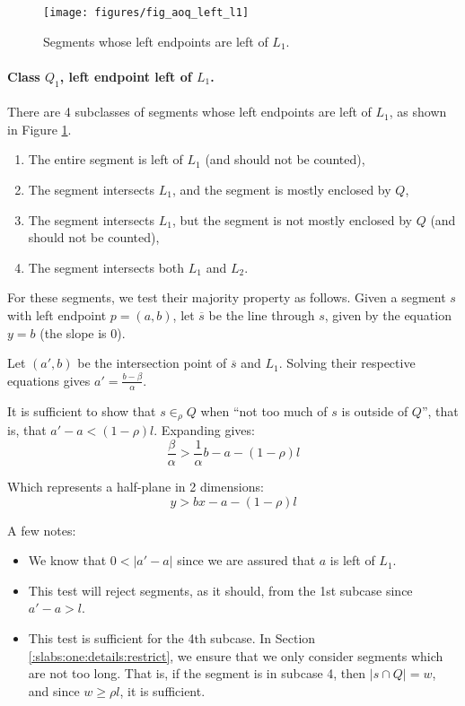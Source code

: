 \begin{figure}[t]
\begin{center}
  \texttt{[image: figures/fig\_aoq\_left\_l1]}
  \caption{Segments whose left endpoints are left of $L_1$.}
  \label{fig:slabs:one:aoq_left_l1}
\end{center}
\end{figure}

\paragraph{Class $Q_1$, left endpoint left of $L_1$.} There are 4 subclasses of segments whose left endpoints are left of $L_1$, as shown in Figure \ref{fig:slabs:one:aoq_left_l1}.

\begin{enumerate}
 \item The entire segment is left of $L_1$ (and should not be counted),

 \item The segment intersects $L_1$, and the segment is mostly enclosed by $Q$,

 \item The segment intersects $L_1$, but the segment is not mostly enclosed by $Q$ (and should not be counted),

 \item The segment intersects both $L_1$ and $L_2$. 

\end{enumerate}

For these segments, we test their majority property as follows. Given a segment $s$ with left endpoint $p = (a,b)$, let $\overline{s}$ be the line through $s$, given by the equation $y = b$ (the slope is 0).

Let $(a', b)$ be the intersection point of $\overline{s}$ and $L_1$. Solving their respective equations gives $a' = \frac{b - \beta}{\alpha}$.

It is sufficient to show that $s \in_\rho Q$ when ``not too much of $s$ is outside of $Q$'', that is, that $a' - a < (1 - \rho)l$. Expanding gives:
\[
\frac{\beta}{\alpha} > \frac{1}{\alpha} b - a - (1 - \rho)l 
\]

\noindent
Which represents a half-plane in 2 dimensions:
\[
y > bx - a - (1 - \rho)l 
\]

\noindent
A few notes: 
\begin{itemize}
 \item We know that $0 < |a' - a|$ since we are assured that $a$ is left of $L_1$.

 \item This test will reject segments, as it should, from the 1st subcase since $a' - a > l$.

 \item This test is sufficient for the 4th subcase. In Section \ref{:slabs:one:details:restrict}, we ensure that we only consider segments which are not too long.  That is, if the segment is in subcase 4, then $|s \cap Q| = w$, and since $w \geq \rho l$, it is sufficient.

\end{itemize}


